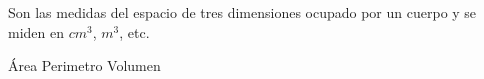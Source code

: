 
\question Son las medidas del espacio de tres dimensiones ocupado por un
          cuerpo y se miden en $cm^3$, $m^3$, etc.

  \begin{oneparchoices}
    \choice Área
    \choice Perimetro
    \CorrectChoice Volumen
  \end{oneparchoices}
